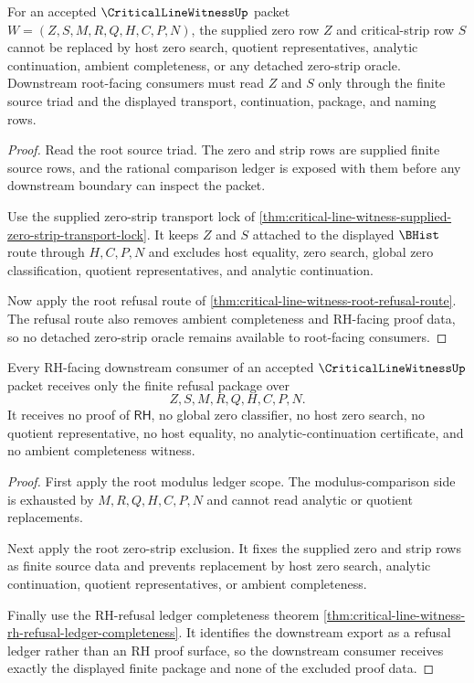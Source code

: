 \begin{theorem}
\label{thm:critical-line-witness-root-zero-strip-exclusion}
For an accepted $\CriticalLineWitnessUp$ packet $W=(Z,S,M,R,Q,H,C,P,N)$, the supplied zero row $Z$ and critical-strip row $S$ cannot be replaced by host zero search, quotient representatives, analytic continuation, ambient completeness, or any detached zero-strip oracle. Downstream root-facing consumers must read $Z$ and $S$ only through the finite source triad and the displayed transport, continuation, package, and naming rows.
\end{theorem}
\begin{proof}
Read the root source triad. The zero and strip rows are supplied finite source rows, and the rational comparison ledger is exposed with them before any downstream boundary can inspect the packet.

Use the supplied zero-strip transport lock of \autoref{thm:critical-line-witness-supplied-zero-strip-transport-lock}. It keeps $Z$ and $S$ attached to the displayed $\BHist$ route through $H,C,P,N$ and excludes host equality, zero search, global zero classification, quotient representatives, and analytic continuation.

Now apply the root refusal route of \autoref{thm:critical-line-witness-root-refusal-route}. The refusal route also removes ambient completeness and RH-facing proof data, so no detached zero-strip oracle remains available to root-facing consumers.
\end{proof}

\begin{theorem}
\label{thm:critical-line-witness-root-rh-boundary-refusal}
Every RH-facing downstream consumer of an accepted $\CriticalLineWitnessUp$ packet receives only the finite refusal package over
$$
Z,S,M,R,Q,H,C,P,N.
$$
It receives no proof of $\mathsf{RH}$, no global zero classifier, no host zero search, no quotient representative, no host equality, no analytic-continuation certificate, and no ambient completeness witness.
\end{theorem}
\begin{proof}
First apply the root modulus ledger scope. The modulus-comparison side is exhausted by $M,R,Q,H,C,P,N$ and cannot read analytic or quotient replacements.

Next apply the root zero-strip exclusion. It fixes the supplied zero and strip rows as finite source data and prevents replacement by host zero search, analytic continuation, quotient representatives, or ambient completeness.

Finally use the RH-refusal ledger completeness theorem \autoref{thm:critical-line-witness-rh-refusal-ledger-completeness}. It identifies the downstream export as a refusal ledger rather than an RH proof surface, so the downstream consumer receives exactly the displayed finite package and none of the excluded proof data.
\end{proof}

